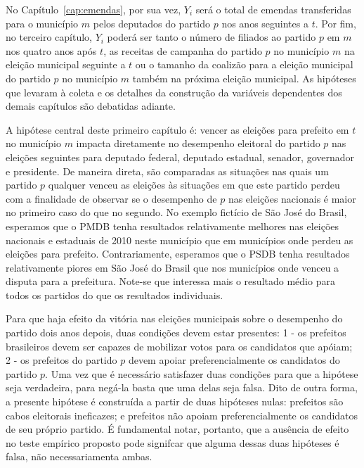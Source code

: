No Capítulo~\ref{cap:emendas}, por sua vez, $Y_{i}$ será o total de emendas transferidas para o município $m$ pelos deputados do partido $p$ nos anos seguintes a $t$. Por fim, no terceiro capítulo, $Y_{i}$ poderá ser tanto o número de filiados ao partido $p$ em $m$ nos quatro anos após $t$, as receitas de campanha do partido $p$ no município $m$ na eleição municipal seguinte a $t$ ou o tamanho da coalizão para a eleição municipal do partido $p$ no município $m$ também na próxima eleição municipal. As hipóteses que levaram à coleta e os detalhes da construção da variáveis dependentes dos demais capítulos são debatidas adiante.

A hipótese central deste primeiro capítulo é: vencer as eleições para prefeito em $t$ no município $m$ impacta diretamente no desempenho eleitoral do partido $p$ nas eleições seguintes para deputado federal, deputado estadual, senador, governador e presidente. De maneira direta, são comparadas as situações nas quais um partido $p$ qualquer venceu as eleições às situações em que este partido perdeu com a finalidade de observar se o desempenho de $p$ nas eleições nacionais é maior no primeiro caso do que no segundo. No exemplo fictício de São José do Brasil, esperamos que o PMDB tenha resultados relativamente melhores nas eleições nacionais e estaduais de 2010 neste município que em municípios onde perdeu as eleições para prefeito. Contrariamente, esperamos que o PSDB tenha resultados relativamente piores em São José do Brasil que nos municípios onde venceu a disputa para a prefeitura. Note-se que interessa mais o resultado médio para todos os partidos do que os resultados individuais.

Para que haja efeito da vitória nas eleições municipais sobre o desempenho do partido dois anos depois, duas condições devem estar presentes: 1 - os prefeitos brasileiros devem ser capazes de mobilizar votos para os candidatos que apóiam; 2 - os prefeitos do partido $p$ devem apoiar preferencialmente os candidatos do partido $p$. Uma vez que é necessário satisfazer duas condições para que a hipótese seja verdadeira, para negá-la basta que uma delas seja falsa. Dito de outra forma, a presente hipótese é construída a partir de duas hipóteses nulas: prefeitos são cabos eleitorais ineficazes; e prefeitos não apoiam preferencialmente os candidatos de seu próprio partido. É fundamental notar, portanto, que a ausência de efeito no teste empírico proposto pode signifcar que alguma dessas duas hipóteses é falsa, não necessariamenta ambas.

